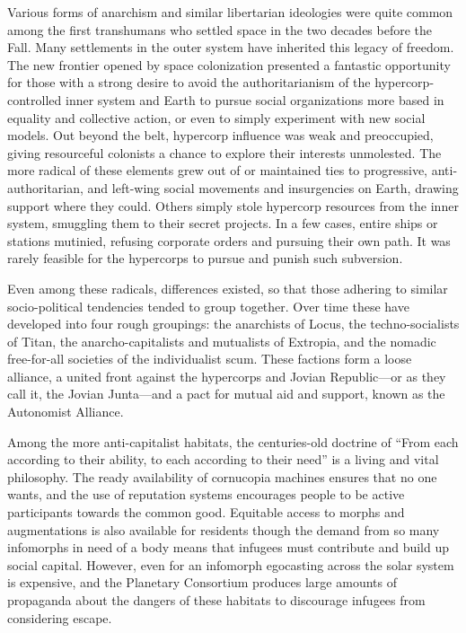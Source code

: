 Various forms of anarchism and similar libertarian 
ideologies were quite common among the first transhumans
who settled space in the two decades before
the Fall. Many settlements in the outer system have 
inherited this legacy of freedom. The new frontier 
opened by space colonization presented a fantastic 
opportunity for those with a strong desire to avoid 
the authoritarianism of the hypercorp-controlled 
inner system and Earth to pursue social organizations 
more based in equality and collective action, or even 
to simply experiment with new social models. Out 
beyond the belt, hypercorp influence was weak and 
preoccupied, giving resourceful colonists a chance to 
explore their interests unmolested. The more radical 
of these elements grew out of or maintained ties to 
progressive, anti-authoritarian, and left-wing social 
movements and insurgencies on Earth, drawing support
where they could. Others simply stole hypercorp
resources from the inner system, smuggling them 
to their secret projects. In a few cases, entire ships 
or stations mutinied, refusing corporate orders and 
pursuing their own path. It was rarely feasible for the 
hypercorps to pursue and punish such subversion.

Even among these radicals, differences existed, so 
that those adhering to similar socio-political tendencies
tended to group together. Over time these have
developed into four rough groupings: the anarchists 
of Locus, the techno-socialists of Titan, the anarcho-capitalists
and mutualists of Extropia, and the nomadic
free-for-all societies of the individualist scum.
These factions form a loose alliance, a united front 
against the hypercorps and Jovian Republic—or as 
they call it, the Jovian Junta—and a pact for mutual 
aid and support, known as the Autonomist Alliance.

Among the more anti-capitalist habitats, the centuries-old
doctrine of ``From each according to their
ability, to each according to their need'' is a living and 
vital philosophy. The ready availability of cornucopia 
machines ensures that no one wants, and the use of 
reputation systems encourages people to be active participants
towards the common good. Equitable access
to morphs and augmentations is also available for residents
though the demand from so many infomorphs
in need of a body means that infugees must contribute 
and build up social capital. However, even for an infomorph
egocasting across the solar system is expensive,
and the Planetary Consortium produces large amounts 
of propaganda about the dangers of these habitats to 
discourage infugees from considering escape.

